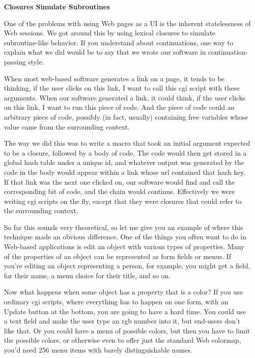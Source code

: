 \documentclass[12pt]{book}
\begin{document}
\textbf{Closures Simulate Subroutines}

One of the problems with using Web pages as a UI is the inherent
statelessness of Web sessions. We got around this by using lexical
closures to simulate subroutine-like behavior. If you understand about
continuations, one way to explain what we did would be to say that we
wrote our software in continuation-passing style.

When most web-based software generates a link on a page, it tends to be
thinking, if the user clicks on this link, I want to call this cgi
script with these arguments. When our software generated a link, it
could think, if the user clicks on this link, I want to run this piece
of code. And the piece of code could an arbitrary piece of code,
possibly (in fact, usually) containing free variables whose value came
from the surrounding context.

The way we did this was to write a macro that took an initial argument
expected to be a closure, followed by a body of code. The code would
then get stored in a global hash table under a unique id, and whatever
output was generated by the code in the body would appear within a link
whose url contained that hash key. If that link was the next one clicked
on, our software would find and call the corresponding bit of code, and
the chain would continue. Effectively we were writing cgi scripts on the
fly, except that they were closures that could refer to the surrounding
context.

So far this sounds very theoretical, so let me give you an example of
where this technique made an obvious difference. One of the things you
often want to do in Web-based applications is edit an object with
various types of properties. Many of the properties of an object can be
represented as form fields or menus. If you're editing an object
representing a person, for example, you might get a field, for their
name, a menu choice for their title, and so on.

Now what happens when some object has a property that is a color? If you
use ordinary cgi scripts, where everything has to happen on one form,
with an Update button at the bottom, you are going to have a hard time.
You could use a text field and make the user type an rgb number into it,
but end-users don't like that. Or you could have a menu of possible
colors, but then you have to limit the possible colors, or otherwise
even to offer just the standard Web colormap, you'd need 256 menu items
with barely distinguishable names.
\end{document}
